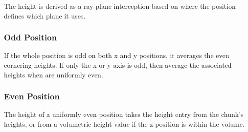     The height is derived as a ray-plane interception based on where the position defines which plane it uses.
\subsubsection{Odd Position}

    If the whole position is odd on both x and y positions, it averages the even cornering heights. If only the x or y axis is odd, then average the associated heights when are uniformly even.

\subsubsection{Even Position}
    The height of a uniformly even position takes the height entry from the chunk's heights, or from a volumetric height value if the z position is within the volume.